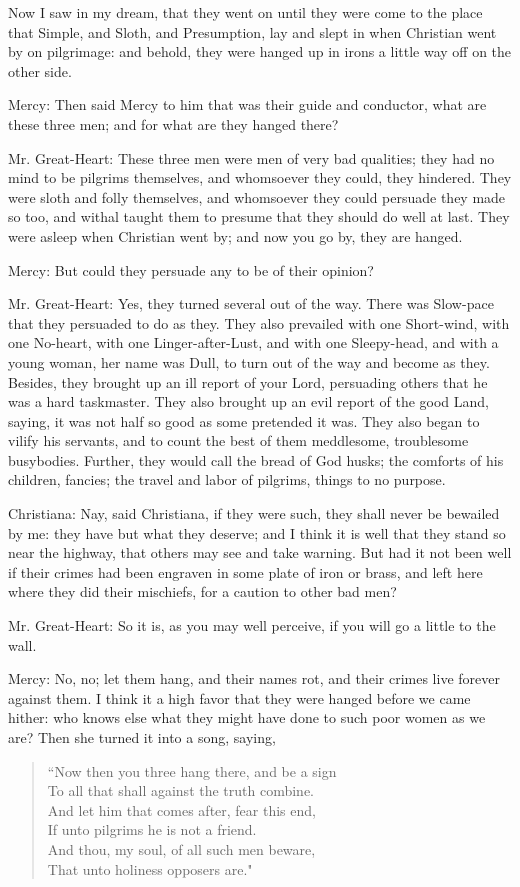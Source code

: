 Now I saw in my dream, that they went on until they were come to the place that Simple, and Sloth, and Presumption, lay and slept in when Christian went by on pilgrimage: and behold, they were hanged up in irons a little way off on the other side.

Mercy: Then said Mercy to him that was their guide and conductor, what are these three men; and for what are they hanged there?

Mr. Great-Heart: These three men were men of very bad qualities; they had no mind to be pilgrims themselves, and whomsoever they could, they hindered. They were sloth and folly themselves, and whomsoever they could persuade they made so too, and withal taught them to presume that they should do well at last. They were asleep when Christian went by; and now you go by, they are hanged.

Mercy: But could they persuade any to be of their opinion?

Mr. Great-Heart: Yes, they turned several out of the way. There was Slow-pace that they persuaded to do as they. They also prevailed with one Short-wind, with one No-heart, with one Linger-after-Lust, and with one Sleepy-head, and with a young woman, her name was Dull, to turn out of the way and become as they. Besides, they brought up an ill report of your Lord, persuading others that he was a hard taskmaster. They also brought up an evil report of the good Land, saying, it was not half so good as some pretended it was. They also began to vilify his servants, and to count the best of them meddlesome, troublesome busybodies. Further, they would call the bread of God husks; the comforts of his children, fancies; the travel and labor of pilgrims, things to no purpose.

Christiana: Nay, said Christiana, if they were such, they shall never be bewailed by me: they have but what they deserve; and I think it is well that they stand so near the highway, that others may see and take warning. But had it not been well if their crimes had been engraven in some plate of iron or brass, and left here where they did their mischiefs, for a caution to other bad men?

Mr. Great-Heart: So it is, as you may well perceive, if you will go a little to the wall.

Mercy: No, no; let them hang, and their names rot, and their crimes live forever against them. I think it a high favor that they were hanged before we came hither: who knows else what they might have done to such poor women as we are? Then she turned it into a song, saying,
\begin{verse}
``Now then you three hang there, and be a sign\\
To all that shall against the truth combine.\\
And let him that comes after, fear this end,\\
If unto pilgrims he is not a friend.\\
And thou, my soul, of all such men beware,\\
That unto holiness opposers are."\\
\end{verse}

